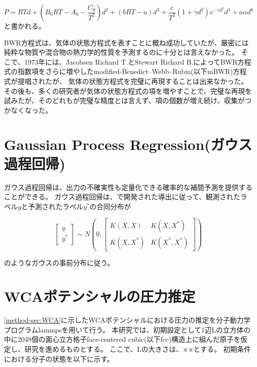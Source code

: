 \documentclass[titlepage]{jsreport}
\begin{document}
\large
\begin{equation}
P=RTd+\left(B_0RT-A_0-{\frac{C_0}{T^2}}\right)d^2+(bRT-a)d^3+{\frac{c}{T^2}}(1+{\gamma}d^2)e^{-{\gamma}d^2}d^3+a{\alpha}d^6\label{eq:BWR}
\end{equation}
\normalsize
と書かれる。

BWR方程式は、気体の状態方程式を表すことに概ね成功していたが、厳密には純粋な物質や混合物の熱力学的性質を予測するのに十分とは言えなかった。
そこで、1973年には、Jacobsen Richard T.とStewart Richard B.によってBWR方程式の指数項をさらに増やしたmodified-Benedict–Webb–Rubin(以下mBWR)方程式が提唱\cite{m-BWR-equation}されたが、
気体の状態方程式を完璧に再現することは出来なかった。
その後も、多くの研究者が気体の状態方程式の項を増やすことで、完璧な再現を試みた\cite{MCCARTY1974276}\cite{BWR-equation:13}\cite{BWR-equation:25}が、そのどれもが完璧な精度とは言えず、項の個数が増え続け、収集がつかなくなった。


\section{Gaussian Process Regression(ガウス過程回帰)}\label{method-sec:Gauss}

ガウス過程回帰は、出力の不確実性も定量化できる確率的な補間予測を提供する\cite{machine-learning}ことができる。
ガウス過程回帰は、\cite{Gaussian-Processes-for-Machine-Learning}で開発された導出に従って、観測されたラベル$y$と予測されたラベル$y^*$の合同分布が

\large
\[
    \left[
        \begin{array}{l}
            y \\
            y^* 
        \end{array}
    \right]
    {\sim} N
    \left(0,
        \left[
            \begin{array}{cc}
                K(X,X) & K(X,X^*)\\    
                K(X,X^*) & K(X^*,X^*)
            \end{array}
        \right]
    \right)
\]
\normalsize

のようなガウスの事前分布に従う。


\section{WCAポテンシャルの圧力推定}\label{method-sec:WCA-press}
\ref{method-sec:WCA}に示したWCAポテンシャルにおける圧力の推定を分子動力学プログラムlammps\cite{lammps}を用いて行う。
本研究では、初期設定として1辺Lの立方体の中に2048個の面心立方格子face-centered cubic(以下fcc)構造上に組んだ原子を仮定し、研究を進めるものとする。
ここで、Lの大きさは、※※とする。
初期条件における分子の状態を以下に示す。
\end{document}
